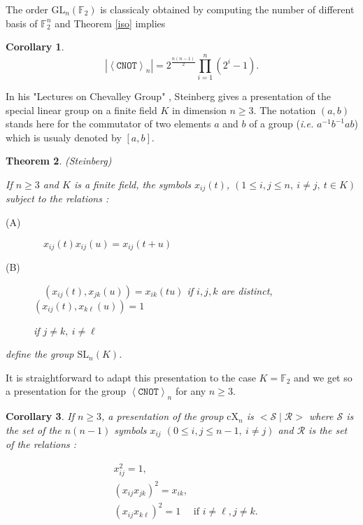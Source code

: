 \documentclass[a4paper,12pt,fleqn]{article}
\newcommand\cnot{\mathtt{CNOT}}
\newcommand\F{\mathbb{F}}
\newcommand\XG[1][n]{\left<\cnot\right>_{#1}}
\newcommand\GL[1][n]{\mathrm{GL}_{#1}(\mathbb{F}_2)}
\renewcommand\geq{\geqslant}
\renewcommand\leq{\leqslant}
\newtheorem{theo}{Theorem}
\newtheorem{cor}[theo]{Corollary}
\begin{document}
The order $\GL$ is classicaly obtained by computing the number of different basis of $\F_2^{n}$ and Theorem \ref{iso} implies
\begin{cor}
\begin{equation}
  \left|\XG\right|=2^{\frac{n(n-1)}{2}}\prod_{i=1}^n(2^i-1).
\end{equation}
\end{cor}

In his "Lectures on Chevalley Group" \cite[Chapter 6]{Steinberg1967}, Steinberg gives a presentation of the special linear group on a finite field $K$ in dimension $n\geq  3$. The notation $(a,b)$ stands here for the commutator of two elements $a$ and $b$ of a group  (\textit{i.e.} $a^{-1}b^{-1}ab$) which is usualy denoted by $[a,b]$.


\begin{theo}(Steinberg)
  
  If $n\geq  3$ and $K$ is a finite field, the symbols $x_{ij} (t)$, $(1 \leq i, j \leq n,\  i\neq j,\  t\in K)$
  subject to the relations :
  \begin{description}
  \item[(A)] $\quad x_{ij} (t)x_{ij} (u) = x_{ij} (t + u)$
  \item[(B)] $\quad (x_{ij}(t), x_{jk}(u)) = x_{ik} (tu)$ if  $i,j,k$ are distinct, $(x_{ij}(t), x_{k\ell}(u)) = 1$

    if $j \neq  k,\  i \neq  \ell$
  \end{description}
  define the group $\mathrm{SL}_n(K)$.
\end{theo}\medskip    

It is straightforward to adapt this presentation to the case $K=\F_2$ and we get so a presentation for the group $\XG$ for any $n\geq  3$.

\begin{cor}\label{cXpres}
  If $n\geq  3$, a presentation of the  group $\mathrm{cX}_n$ is $<\mathcal{S}\mid \mathcal{R}>$ where $\mathcal{S}$ is the set of the $n(n-1)$ symbols $x_{ij}$  $(0\leq i,j\leq n-1,\ i\neq j)$  and $\mathcal{R}$ is the set of the relations :                        
  \vspace{-5mm}
  
  \begin{align}
    &x_{ij}^2=1, \label{invxij}\\
    &(x_{ij}x_{jk})^2=x_{ik},\\
    &(x_{ij}x_{k\ell})^2=1\quad \text{ if } i\neq \ell,j\neq k.
  \end{align}
    
\end{cor}
\end{document}
